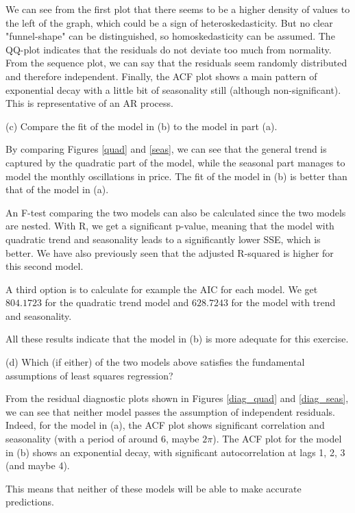 \documentclass[]{article}
\begin{document}
We can see from the first plot that there seems to be a higher density of values to the left of the graph, which could be a sign of heteroskedasticity. But no clear "funnel-shape" can be distinguished, so homoskedasticity can be assumed. The QQ-plot indicates that the residuals do not deviate too much from normality. From the sequence plot, we can say that the residuals seem randomly distributed and therefore independent. Finally, the ACF plot shows a main pattern of exponential decay with a little bit of seasonality still (although non-significant). This is representative of an AR process.

\color{black}

(c) Compare the fit of the model in (b) to the model in part (a).

\color{blue}
By comparing Figures \ref{quad} and \ref{seas}, we can see that the general trend is captured by the quadratic part of the model, while the seasonal part manages to model the monthly oscillations in price. The fit of the model in (b) is better than that of the model in (a).

An F-test comparing the two models can also be calculated since the two models are nested. With R, we get a significant p-value, meaning that the model with quadratic trend and seasonality leads to a significantly lower SSE, which is better. We have also previously seen that the adjusted R-squared is higher for this second model.

A third option is to calculate for example the AIC for each model. We get $804.1723$ for the quadratic trend model and $628.7243$ for the model with trend and seasonality.

All these results indicate that the model in (b) is more adequate for this exercise. 
\color{black}

(d) Which (if either) of the two models above satisfies the fundamental assumptions of least squares regression?

\color{blue}
From the residual diagnostic plots shown in Figures \ref{diag_quad} and \ref{diag_seas}, we can see that neither model passes the assumption of independent residuals. Indeed, for the model in (a), the ACF plot shows significant correlation and seasonality (with a period of around 6, maybe $2\pi$). The ACF plot for the model in (b) shows an exponential decay, with significant autocorrelation at lags 1, 2, 3 (and maybe 4).

This means that neither of these models will be able to make accurate predictions.
\color{black}
\end{document}
